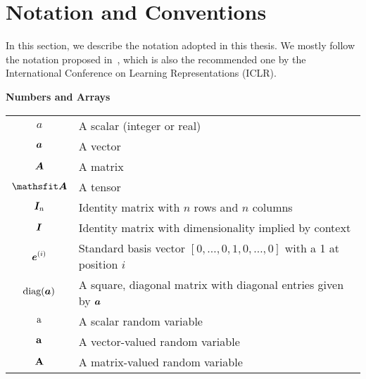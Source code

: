 \chapter*{Notation and Conventions}
\label{notation}

\newlength{\notationgap}
\setlength{\notationgap}{1pc}

In this section, we describe the notation adopted in this thesis. We mostly follow the notation proposed in~\citet{Goodfellow2016}, which is also the recommended one by the International Conference on Learning Representations (ICLR).

\vspace{\notationgap}
\begin{minipage}{\textwidth}
	\centerline{\bf Numbers and Arrays}
	\bgroup
	\def\arraystretch{1.5}
	\begin{tabular}{cp{3.25in}}
		$\displaystyle a$ & A scalar (integer or real)\\
		$\displaystyle {\bm{a}}$ & A vector\\
		$\displaystyle {\bm{A}}$ & A matrix\\
		$\displaystyle \tA$ & A tensor\\
		$\displaystyle {\bm{I}}_n$ & Identity matrix with $n$ rows and $n$ columns\\
		$\displaystyle {\bm{I}}$ & Identity matrix with dimensionality implied by context\\
		$\displaystyle {\bm{e}}^{(i)}$ & Standard basis vector $[0,\dots,0,1,0,\dots,0]$ with a 1 at position $i$\\
		$\displaystyle \text{diag}({\bm{a}})$ & A square, diagonal matrix with diagonal entries given by ${\bm{a}}$\\
		$\displaystyle {\textnormal{a}}$ & A scalar random variable\\
		$\displaystyle {\mathbf{a}}$ & A vector-valued random variable\\
		$\displaystyle {\mathbf{A}}$ & A matrix-valued random variable\\
	\end{tabular}
	\egroup
\end{minipage}

